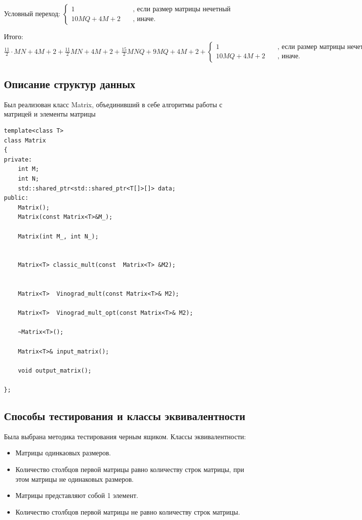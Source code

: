 \noindent
Условный переход: $ \begin{cases}
    1 & \quad \text{, если размер матрицы нечетный} \\
    10 MQ + 4M + 2 & \quad \text{, иначе.}
\end{cases} $

\noindent
Итого: $\frac{11}{2} \cdot MN + 4M + 2 + \frac{11}{2}MN + 4M + 2 + \frac{15}{2}MNQ + 9 MQ + 4M + 2 + \begin{cases}
    1 & \quad \text{, если размер матрицы нечетный} \\
    10 MQ + 4M + 2 & \quad \text{, иначе.}
\end{cases}$

\subsection{Описание структур данных}
Был реализован класс Matrix, объединивший в себе алгоритмы работы с матрицей и элементы матрицы
\begin{lstlisting}[caption=Описание класса Matrix, label=list:canon, language={}]
template<class T>
class Matrix
{
private:
	int M;
	int N;
	std::shared_ptr<std::shared_ptr<T[]>[]> data;
public:
	Matrix();
	Matrix(const Matrix<T>&M_);

	Matrix(int M_, int N_);
	
	
	Matrix<T> classic_mult(const  Matrix<T> &M2);


	Matrix<T>  Vinograd_mult(const Matrix<T>& M2);

	Matrix<T>  Vinograd_mult_opt(const Matrix<T>& M2);
	
	~Matrix<T>();

	Matrix<T>& input_matrix();

	void output_matrix();

};
\end{lstlisting}

\subsection{Способы тестирования и классы эквивалентности}
Была выбрана методика тестирования черным ящиком. 
Классы эквивалентности:
\begin{itemize}
	\item Матрицы одинкаовых размеров.
	\item Количество столбцов первой матрицы равно количеству строк матрицы, при этом матрицы не одинаковых размеров.
	\item Матрицы представляют собой 1 элемент.
	\item Количество столбцов первой матрицы не равно количеству строк матрицы.
\end{itemize}
